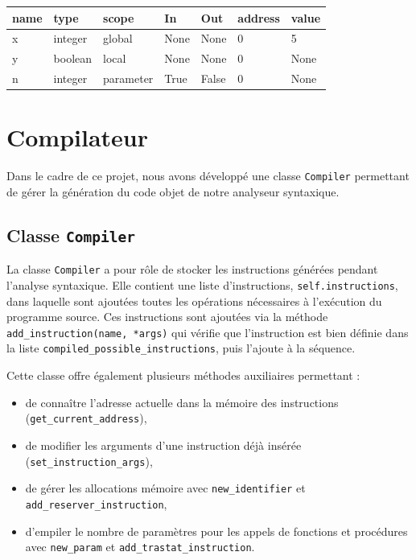 \documentclass[a4paper, 12pt]{article}
\begin{document}
    \begin{center}
        \begin{tabular}{|l|l|l|l|l|l|l|}
            \hline
            \textbf{name} & \textbf{type} & \textbf{scope} & \textbf{In} & \textbf{Out} & \textbf{address} & \textbf{value} \\
            \hline
            x & integer & global & None & None & 0 & 5 \\
            y & boolean & local & None & None & 0 & None \\
            n & integer & parameter & True & False & 0 & None \\
            \hline
        \end{tabular}
    \end{center}

    \section{Compilateur}

    Dans le cadre de ce projet, nous avons développé une classe \texttt{Compiler} permettant de gérer la génération du code objet de notre analyseur syntaxique.

    \subsection{Classe \texttt{Compiler}}

    La classe \texttt{Compiler} a pour rôle de stocker les instructions générées pendant l'analyse syntaxique. Elle contient une liste d'instructions, \texttt{self.instructions}, dans laquelle sont ajoutées toutes les opérations nécessaires à l'exécution du programme source. Ces instructions sont ajoutées via la méthode \texttt{add\_instruction(name, *args)} qui vérifie que l'instruction est bien définie dans la liste \texttt{compiled\_possible\_instructions}, puis l’ajoute à la séquence.

    Cette classe offre également plusieurs méthodes auxiliaires permettant :

    \begin{itemize}
        \item de connaître l'adresse actuelle dans la mémoire des instructions (\texttt{get\_current\_address}),
        \item de modifier les arguments d'une instruction déjà insérée (\texttt{set\_instruction\_args}),
        \item de gérer les allocations mémoire avec \texttt{new\_identifier} et \texttt{add\_reserver\_instruction},
        \item d'empiler le nombre de paramètres pour les appels de fonctions et procédures avec \texttt{new\_param} et \texttt{add\_trastat\_instruction}.
    \end{itemize}
\end{document}
